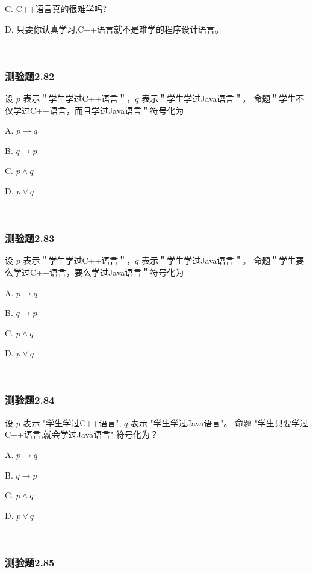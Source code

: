 \documentclass[UTF8, heading=true]{ctexart}
\begin{document}
C. C++语言真的很难学吗?

D. 只要你认真学习,C++语言就不是难学的程序设计语言。

\textcolor{white}{答案：AD}

\subsubsection{测验题2.82}

设 $p$ 表示＂学生学过C++语言＂，$q$ 表示＂学生学过Java语言＂，
命题＂学生不仅学过C++语言，而且学过Java语言＂符号化为 $\qquad$

A. $p \rightarrow q$

B. $q \rightarrow p$

C. $p \wedge q$

D.  $p \vee q$

\textcolor{white}{答案：C}

\subsubsection{测验题2.83}

设 $p$ 表示＂学生学过C++语言＂，$q$ 表示＂学生学过Java语言＂。
命题＂学生要么学过C++语言，要么学过Java语言＂符号化为 $\qquad$

A. $
p \rightarrow q
$


B. $
q \rightarrow p
$


C. $
p \wedge q
$


D.  $
p \vee q
$

\textcolor{white}{答案：D}



\subsubsection{测验题2.84}

设 $p$ 表示 "学生学过C++语言", $q$ 表示 "学生学过Java语言"。
命题 "学生只要学过C++语言,就会学过Java语言" 符号化为？

A. $ p \rightarrow q$

B. $ q \rightarrow p$

C. $ p \wedge q$

D. $ p \vee q$

\textcolor{white}{答案：A}

\subsubsection{测验题2.85}
\end{document}
